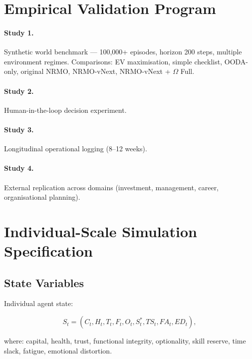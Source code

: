 \section{Empirical Validation Program}
\label{sec:omega-validation-program}

\paragraph{Study 1.}
Synthetic world benchmark --- 100{,}000+ episodes, horizon 200
steps, multiple environment regimes. Comparisons: EV maximisation,
simple checklist, OODA-only, original NRMO, NRMO-vNext, NRMO-vNext +
$\Omega$ Full.

\paragraph{Study 2.}
Human-in-the-loop decision experiment.

\paragraph{Study 3.}
Longitudinal operational logging (8--12 weeks).

\paragraph{Study 4.}
External replication across domains (investment, management, career,
organisational planning).

\section{Individual-Scale Simulation Specification}
\label{sec:omega-individual-scale}

\subsection{State Variables}
\label{sec:omega-individual-state}

Individual agent state:

\begin{equation}
S_t = (C_t, H_t, T_t, F_t, O_t, S_t^*, \mathit{TS}_t,
\mathit{FA}_t, \mathit{ED}_t),
\label{eq:omega-individual-state}
\end{equation}

where: capital, health, trust, functional integrity, optionality,
skill reserve, time slack, fatigue, emotional distortion.


